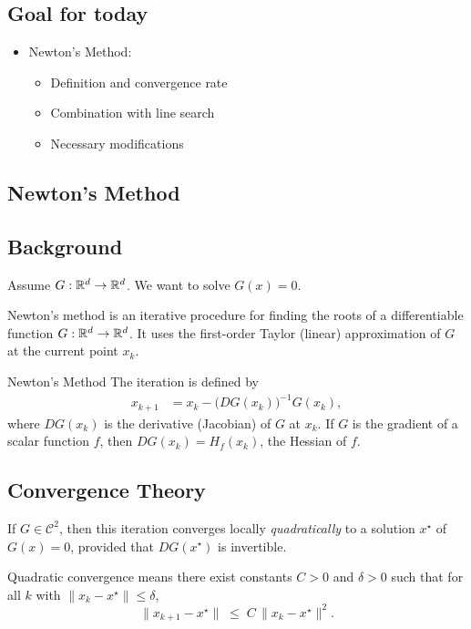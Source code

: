 \subsection*{Goal for today}
\begin{itemize}
  \item Newton's Method:
        \begin{itemize}
          \item Definition and convergence rate
          \item Combination with line search
          \item Necessary modifications
        \end{itemize}
\end{itemize}

\subsection*{Newton's Method}

\subsection*{Background}
Assume \(G: \mathbb{R}^d \to \mathbb{R}^d\). We want to solve \(G(x) = 0\).

Newton's method is an iterative procedure for finding the roots of a differentiable function \(G: \mathbb{R}^d \to \mathbb{R}^d\).
It uses the first-order Taylor (linear) approximation of \(G\) at the current point \(x_k\).

\begin{definition}{Newton's Method}{}
  The iteration is defined by
  \begin{align*}
    x_{k+1} & = x_k - \bigl(D G(x_k)\bigr)^{-1} G(x_k),
  \end{align*}
  where \(D G(x_k)\) is the derivative (Jacobian) of \(G\) at \(x_k\). If \(G\) is the gradient of a scalar function \(f\), then \(DG(x_k) = H_f(x_k)\), the Hessian of \(f\).
\end{definition}

\subsection*{Convergence Theory}
If \(G\in \mathcal{C}^2\), then this iteration converges locally \emph{quadratically} to
a solution \(x^\star\) of \(G(x) = 0\), provided that \(D G(x^\star)\) is invertible.

\begin{remark}
  Quadratic convergence means there exist constants \(C>0\) and \(\delta>0\) such that for all \(k\) with \(\|x_k - x^\star\|\le \delta\),
  \[
    \|x_{k+1} - x^\star\| \;\le\; C \,\|x_k - x^\star\|^2.
  \]
\end{remark}

